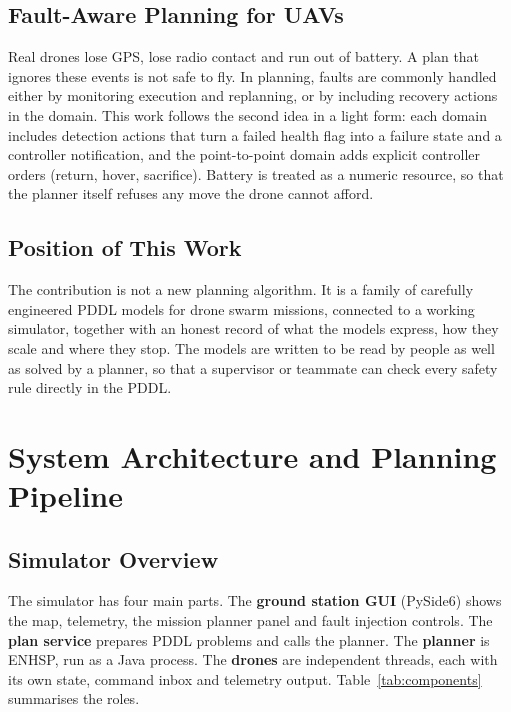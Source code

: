 \documentclass[11pt,a4paper,oneside]{report}
\begin{document}
\section{Fault-Aware Planning for UAVs}
Real drones lose GPS, lose radio contact and run out of battery. A plan that ignores these events
is not safe to fly. In planning, faults are commonly handled either by monitoring execution and
replanning, or by including recovery actions in the domain. This work follows the second idea in
a light form: each domain includes detection actions that turn a failed health flag into a failure
state and a controller notification, and the point-to-point domain adds explicit controller
orders (return, hover, sacrifice). Battery is treated as a numeric resource, so that the planner
itself refuses any move the drone cannot afford.

\section{Position of This Work}
The contribution is not a new planning algorithm. It is a family of carefully engineered PDDL
models for drone swarm missions, connected to a working simulator, together with an honest record
of what the models express, how they scale and where they stop. The models are written to be
read by people as well as solved by a planner, so that a supervisor or teammate can check every
safety rule directly in the PDDL.

\chapter{System Architecture and Planning Pipeline}\label{ch:arch}

\section{Simulator Overview}
The simulator has four main parts. The \textbf{ground station GUI} (PySide6) shows the map,
telemetry, the mission planner panel and fault injection controls. The \textbf{plan service}
prepares PDDL problems and calls the planner. The \textbf{planner} is ENHSP, run as a Java
process. The \textbf{drones} are independent threads, each with its own state, command inbox and
telemetry output. Table~\ref{tab:components} summarises the roles.
\end{document}
